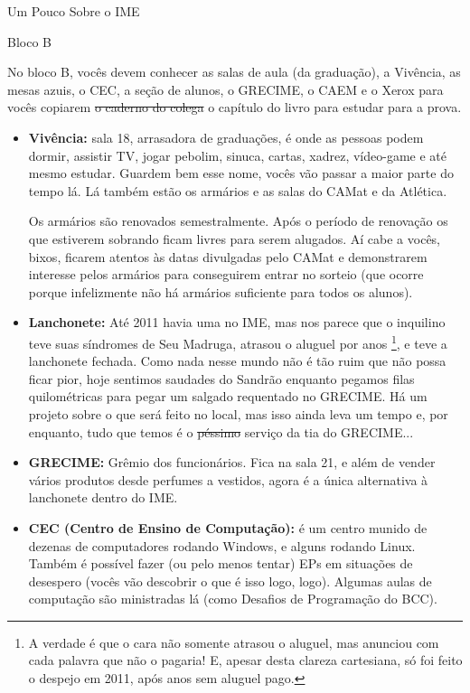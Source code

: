 \begin{secao}{Um Pouco Sobre o IME}
\begin{subsecao}{Bloco B}


No bloco B, vocês devem conhecer as salas de aula (da graduação), a Vivência, as
mesas azuis, o CEC, a seção de alunos, o GRECIME, o CAEM e o Xerox para vocês
copiarem \sout{o caderno do colega} o capítulo do livro para estudar para a prova.

\begin{itemize}
\item {\bf Vivência:} sala 18, arrasadora de graduações, é onde as pessoas podem 
dormir, assistir TV, jogar pebolim, sinuca, cartas, xadrez, vídeo-game e até 
mesmo estudar. Guardem bem esse nome, vocês vão passar a maior parte do tempo lá. 
Lá também estão os armários e as salas do CAMat e da Atlética.

Os armários são renovados semestralmente. Após o período de renovação os que 
estiverem sobrando ficam livres para serem alugados. Aí cabe a vocês, bixos, ficarem 
atentos às datas divulgadas pelo CAMat e demonstrarem interesse pelos armários para 
conseguirem entrar no sorteio (que ocorre porque infelizmente não há armários 
suficiente para todos os alunos).

\item {\bf Lanchonete:} Até 2011 havia uma no IME, mas nos parece que o inquilino
teve suas síndromes de Seu Madruga, atrasou o aluguel por anos \footnote{A verdade 
é que o cara não somente atrasou o aluguel, mas anunciou com cada palavra que não 
o pagaria! E, apesar desta clareza cartesiana, só foi feito o despejo em 2011, 
após anos sem aluguel pago.}, e teve a lanchonete fechada. Como nada nesse
mundo não é tão ruim que não possa ficar pior, hoje sentimos saudades do Sandrão
enquanto pegamos filas quilométricas para pegar um salgado requentado no GRECIME.
Há um projeto sobre o que será feito no local, mas isso ainda leva um tempo e, 
por enquanto, tudo que temos é o \sout{péssimo} serviço da tia do GRECIME... 

\item {\bf GRECIME:} Grêmio dos funcionários. Fica na sala 21, e além de vender
vários produtos desde perfumes a vestidos, agora é a única alternativa à
lanchonete dentro do IME.

\item {\bf CEC (Centro de Ensino de Computação):} é um centro munido de dezenas
de computadores rodando Windows, e alguns rodando Linux. Também é possível fazer 
(ou pelo menos tentar) EPs em situações de desespero (vocês vão descobrir o que é 
isso logo, logo). Algumas aulas de computação são ministradas lá (como Desafios 
de Programação do BCC).
 

\end{itemize}
\end{subsecao}
\end{secao}
